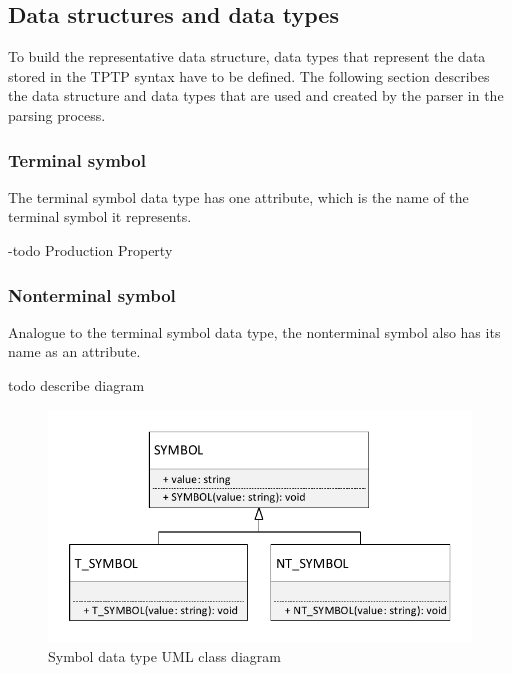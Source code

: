 \subsection{Data structures and data types}\label{sec:ConceptParserDataStructure}
To build the representative data structure, data types that represent the data stored in the \ac{TPTP} syntax have to be defined.
The following section describes the data structure and data types that are used and created by the parser in the parsing process.


\subsubsection{Terminal symbol}
The terminal symbol data type has one attribute, which is the name of the terminal symbol it represents.

-todo Production Property

\subsubsection{Nonterminal symbol}
Analogue to the terminal symbol data type, the nonterminal symbol also has its name as an attribute.

todo describe diagram
\begin{figure}[H]
\centering
\includegraphics[width=.8\textwidth]{images/Concept_uml_data_types_symbols.pdf}
\caption{Symbol data type UML class diagram}
\label{fig:ConceptSymbolsClassDiagram}
\end{figure}

